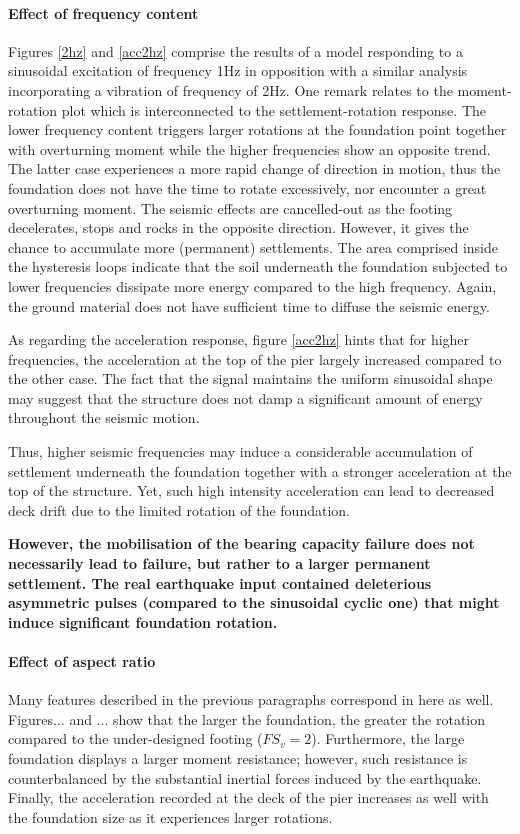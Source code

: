  \paragraph{Effect of frequency content}
 Figures \ref{2hz} and \ref{acc2hz} comprise the results of a model responding to a sinusoidal excitation of frequency 1Hz in opposition with a similar analysis incorporating a vibration of frequency of 2Hz. One remark relates to the moment-rotation plot which is interconnected to the settlement-rotation response. The lower frequency content triggers larger rotations at the foundation point together with overturning moment while the higher frequencies show an opposite trend. The latter case experiences a more rapid change of direction in motion, thus the foundation does not have the time to rotate excessively, nor encounter a great overturning moment. The seismic effects are cancelled-out as the footing decelerates, stops and rocks in the opposite direction. However, it gives the chance to accumulate more (permanent) settlements. The area comprised inside the hysteresis loops indicate that the soil underneath the foundation subjected to lower frequencies dissipate more energy compared to the high frequency. Again, the ground material does not have sufficient time to diffuse the seismic energy.
 
 As regarding the acceleration response, figure \ref{acc2hz} hints that for higher frequencies, the acceleration at the top of the pier largely increased compared to the other case. The fact that the signal maintains the uniform sinusoidal shape may suggest that the structure does not damp a significant amount of energy throughout the seismic motion.
 
 Thus, higher seismic frequencies may induce a considerable accumulation of settlement underneath the foundation together with a stronger acceleration at the top of the structure. Yet, such high intensity acceleration can lead to decreased deck drift due to the limited rotation of the foundation.  
 
 \textbf{However, the mobilisation of the bearing capacity failure does not necessarily lead to failure, but rather to a larger permanent settlement. 
The real earthquake input contained deleterious asymmetric pulses (compared to the sinusoidal cyclic one) that might induce significant foundation rotation.}


\paragraph{Effect of aspect ratio}
Many features described in the previous paragraphs correspond in here as well. Figures... and ... show that the larger the foundation, the greater the rotation compared to the under-designed footing ($FS_v=2$). Furthermore, the large foundation displays a larger moment resistance; however, such resistance is counterbalanced by the substantial inertial forces induced by the earthquake. Finally, the acceleration recorded at the deck of the pier increases as well with the foundation size as it experiences larger rotations. 


